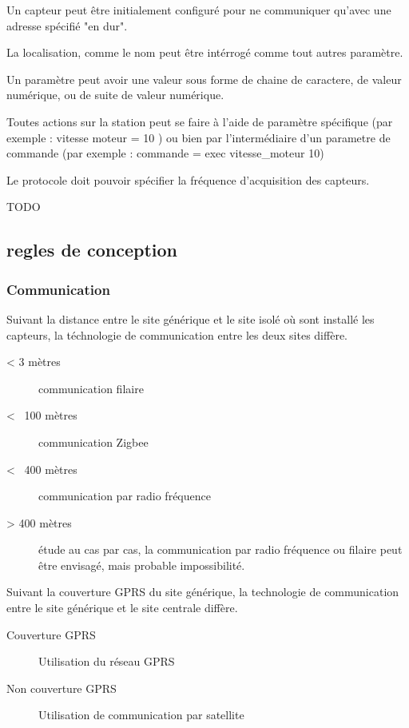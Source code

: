         Un capteur peut être initialement configuré pour ne communiquer qu'avec une adresse spécifié "en dur".

        La localisation, comme le nom peut être intérrogé comme tout autres paramètre.

        Un paramètre peut avoir une valeur sous forme de chaine de caractere, de valeur numérique, ou de suite de valeur numérique.


        Toutes actions sur la station peut se faire à l'aide de paramètre spécifique (par exemple : vitesse moteur = 10 )
        ou bien par l'intermédiaire d'un parametre de commande (par exemple : commande = exec vitesse_moteur 10)

        Le protocole doit pouvoir spécifier la fréquence d'acquisition des capteurs.

        {\huge TODO}


    \subsection{regles de conception}
        
        \subsubsection{Communication}
        
            Suivant la distance entre le site générique et le site isolé où sont installé les capteurs, la téchnologie de communication entre les deux sites diffère.
            \begin{description}
                \item[< 3 mètres] communication filaire
                \item[< ~100 mètres] communication Zigbee
                \item[< ~400 mètres] communication par radio fréquence
                \item[> 400 mètres] étude au cas par cas, la communication par radio fréquence ou filaire peut être envisagé, mais probable impossibilité.
            \end{description}
            
            Suivant la couverture GPRS du site générique, la technologie de communication entre le site générique et le site centrale diffère.
            \begin{description}
                \item[Couverture GPRS] Utilisation du réseau GPRS
                \item[Non couverture GPRS] Utilisation de communication par satellite
            \end{description}
            
